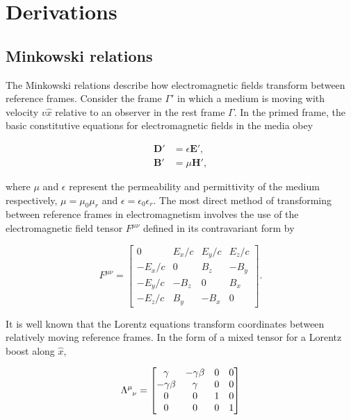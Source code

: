 \chapter{Derivations}

\section{Minkowski relations}
The Minkowski relations describe how electromagnetic fields transform between reference frames. Consider the frame $\Gamma'$ in which a medium is moving with velocity $v \hat{x}$ relative to an observer in the rest frame $\Gamma$. In the primed frame, the basic constitutive equations for electromagnetic fields in the media obey 

\begin{align}
\bm{D'} &= \epsilon \bm{E'} \label{const1},\\
\bm{B'} &= \mu \bm{H'} \label{const2},
\end{align}

where $\mu$ and $\epsilon$ represent the permeability and permittivity of the medium respectively, $\mu = \mu_0 \mu_r$ and $\epsilon = \epsilon_0 \epsilon_r$. The most direct method of transforming between reference frames in electromagnetism involves the use of the electromagnetic field tensor $F^{\mu \nu}$ defined in its contravariant form by 

\begin{equation}
F^{\mu \nu} = 
\begin{bmatrix}
0 & E_x/c & E_y/c & E_z/c \\
-E_x/c & 0 & B_z & -B_y \\
-E_y/c & -B_z & 0 & B_x \\
-E_z/c & B_y & -B_x & 0
\end{bmatrix}.
\label{eqn:emtensor}
\end{equation}

It is well known that the Lorentz equations transform coordinates between relatively moving reference frames. In the form of a mixed tensor for a Lorentz boost along $\hat{x}$,

\begin{equation}
\label{lorentz}
\tensor{\Lambda}{^\mu_\nu} =
\begin{bmatrix}
\gamma & -\gamma\beta & 0 & 0 \\
-\gamma \beta & \gamma & 0 & 0 \\
0 & 0 & 1 & 0 \\
0 & 0 & 0 & 1 
\end{bmatrix}
\end{equation}


